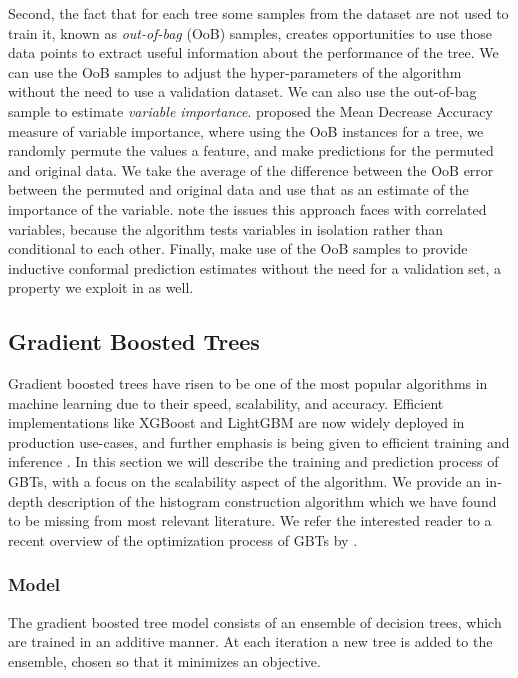 Second, the fact that for each tree some samples from the dataset are not
used to train it, known as \emph{out-of-bag} (OoB) samples, creates opportunities
to use those data points to extract useful information about the performance
of the tree. We can use the OoB samples to adjust the hyper-parameters of the
algorithm without the need to use a validation dataset. We can also use
the out-of-bag sample to estimate \emph{variable importance}.
\citet{random-forests} proposed the Mean Decrease Accuracy measure of
variable importance, where using the OoB instances for a tree, we
randomly permute the values a feature, and make predictions
for the permuted and original data. We take the average
of the difference between the OoB error between the permuted
and original data and use that as an estimate of the importance
of the variable. \citet{random-forest-survey} note the
issues this approach faces with correlated variables, because the
algorithm tests variables in isolation rather than conditional
to each other.
Finally, \citet{johansson2013conformal} make use of the OoB samples to provide
inductive conformal prediction estimates without the need for a
validation set, a property we exploit in \uncertaintrees as well.

\subsection{Gradient Boosted Trees}
\label{sec:bg-dt-gbts}

Gradient boosted trees have risen to be one of the most popular algorithms
in machine learning due to their speed, scalability, and accuracy. Efficient
implementations like XGBoost \cite{xgboost} and LightGBM \cite{lightgbm}
are now widely deployed in production use-cases, and further emphasis
is being given to efficient training \cite{dimboost} and inference \cite{quickscorer}.
In this section we will describe the training and prediction process of GBTs,
with a focus on the scalability aspect of the algorithm. We provide an in-depth
description of the histogram construction algorithm which we have found to be missing
from most relevant literature. We refer the interested reader to a recent overview
of the optimization process of GBTs by \citet{biau-optimization}.

\subsubsection*{Model}

The gradient boosted tree model consists of an ensemble of decision trees,
which are trained in an additive manner. At each iteration a new tree is added
to the ensemble, chosen so that it minimizes an objective.

